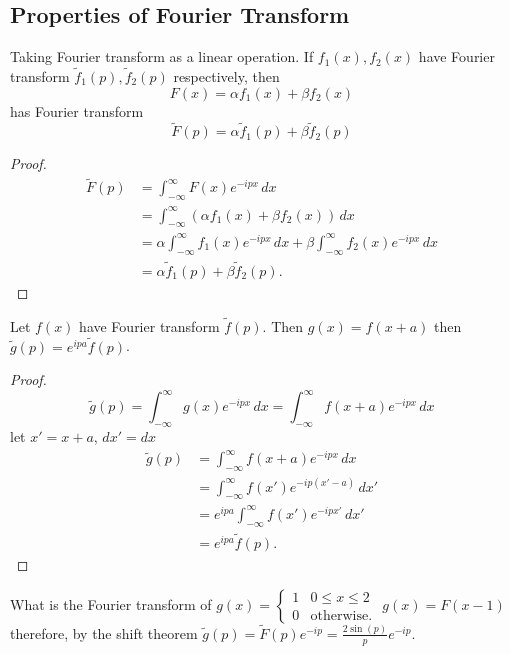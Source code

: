 \documentclass[10pt, a4paper]{article}
\begin{document}
\subsection{Properties of Fourier Transform}
Taking Fourier transform as a linear operation.
If $f_1(x), f_2(x)$ have Fourier transform $\tilde{f}_1(p), \tilde{f}_2(p)$ respectively,
then
\[
F(x) = \alpha f_1(x) + \beta f_2(x)
\]
has Fourier transform
\[
\tilde{F}(p) = \alpha\tilde{f}_1(p) + \beta\tilde{f}_2(p)
\]
\begin{proof}
    \begin{align*}
        \tilde{F}(p) &= \int_{-\infty}^{\infty}F(x)e ^ {-ipx}\,dx \\
        &= \int_{-\infty}^{\infty}(\alpha f_1(x) + \beta f_2(x))\,dx \\
        &= \alpha\int_{-\infty}^{\infty}f_1(x)e ^ {-ipx}\,dx + \beta\int_{-\infty}^{\infty}f_2(x)e ^ {-ipx}\,dx \\
        &= \alpha\tilde{f}_1(p) + \beta\tilde{f}_2(p).
    \end{align*}
\end{proof}

\begin{theorem}
    Let $f(x)$ have Fourier transform $\tilde{f}(p)$.
    Then $g(x) = f(x + a)$ then $\tilde{g}(p) = e ^ {ipa}\tilde{f}(p)$.

    \begin{proof}
        \[
        \tilde{g}(p) = \int_{-\infty}^{\infty}g(x)e ^ {-ipx}\,dx = \int_{-\infty}^{\infty}f(x + a)e ^ {-ipx}\,dx
        \]
        let $x' = x + a$,
        $dx' = dx$
        \begin{align*}
            \tilde{g}(p) &= \int_{-\infty}^{\infty}f(x + a)e ^ {-ipx}\,dx \\
            &= \int_{-\infty}^{\infty}f(x')e ^ {-ip(x' - a)}\,dx' \\
            &= e ^ {ipa}\int_{-\infty}^{\infty}f(x')e ^ {-ipx'}\,dx' \\
            &= e ^ {ipa}\tilde{f}(p).
        \end{align*}
    \end{proof}
\end{theorem}

\begin{example}
    What is the Fourier transform of $g(x) = \begin{cases}
        1 & 0 \leq x \leq 2 \\
        0 & \text{otherwise}.
    \end{cases}$
    $g(x) = F(x - 1)$ therefore,
    by the shift theorem $\tilde{g}(p) = \tilde{F}(p)e ^ {-ip} = \frac{2\sin(p)}{p}e ^ {-ip}$.
\end{example}
\end{document}
